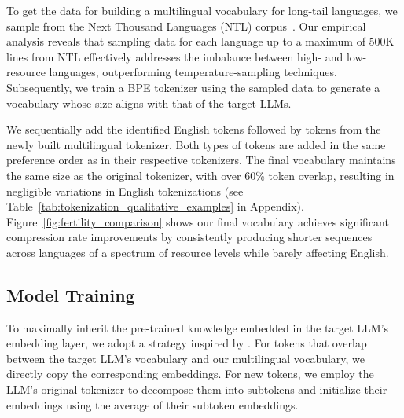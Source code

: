 To get the data for building a multilingual vocabulary for long-tail languages, we sample from the Next Thousand Languages (NTL) corpus~\citep{caswell-etal-2020-language, bapna2022building}.
Our empirical analysis reveals that sampling data for each language up to a maximum of 500K lines from NTL effectively addresses the imbalance between high- and low-resource languages, outperforming temperature-sampling techniques. 
Subsequently, we train a BPE tokenizer using the sampled data to generate a vocabulary whose size aligns with that of the target LLMs.


We sequentially add the identified English tokens followed by tokens from the newly built multilingual tokenizer. Both types of tokens are added in the same preference order as in their respective tokenizers. The final vocabulary maintains the same size as the original tokenizer, with over 60\% token overlap, resulting in negligible variations in English tokenizations (see  Table~\ref{tab:tokenization_qualitative_examples} in Appendix).
Figure~\ref{fig:fertility_comparison} shows our final vocabulary achieves significant compression rate improvements by consistently producing shorter sequences across languages of a spectrum of resource levels while barely affecting English.

\subsection{Model Training}\label{sec:model_training}

To maximally inherit the pre-trained knowledge embedded in the target LLM's embedding layer, we adopt a strategy inspired by \citet{gee-etal-2022-fast}. For tokens that overlap between the target LLM's vocabulary and our multilingual vocabulary, we directly copy the corresponding embeddings. For new tokens, we employ the LLM's original tokenizer to decompose them into subtokens and initialize their embeddings using the average of their subtoken embeddings.

